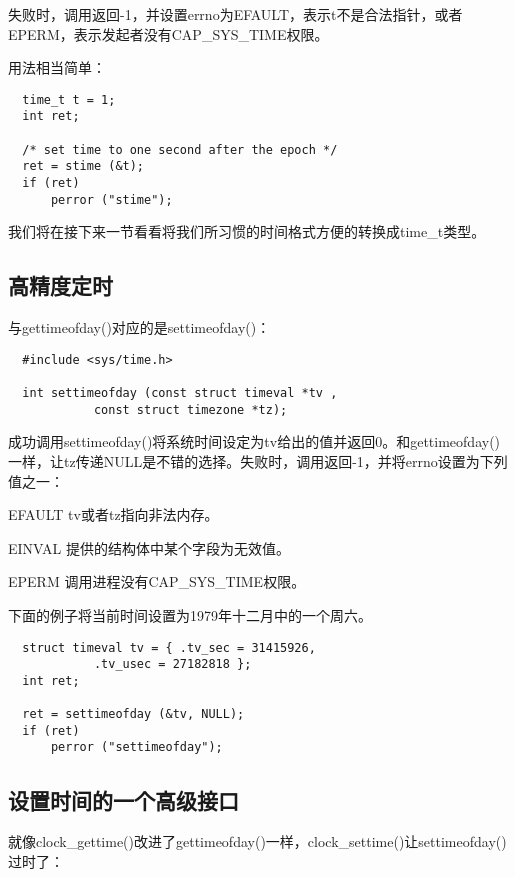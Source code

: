 失败时，调用返回-1，并设置errno为EFAULT，表示t不是合法指针，或者EPERM，表示发起者没有CAP\_SYS\_TIME权限。

用法相当简单： 

\begin{lstlisting}
  time_t t = 1;
  int ret;

  /* set time to one second after the epoch */
  ret = stime (&t);
  if (ret)
      perror ("stime");
\end{lstlisting}

我们将在接下来一节看看将我们所习惯的时间格式方便的转换成time\_t类型。 

\subsection{高精度定时}

与gettimeofday()对应的是settimeofday()： 

\begin{lstlisting}
  #include <sys/time.h>

  int settimeofday (const struct timeval *tv ,
  		    const struct timezone *tz);
\end{lstlisting}

成功调用settimeofday()将系统时间设定为tv给出的值并返回0。和gettimeofday()一样，让tz传递NULL是不错的选择。失败时，调用返回-1，并将errno设置为下列值之一： 

\begin{eqlist*}
\item [EFAULT]
tv或者tz指向非法内存。 
\item [EINVAL]
提供的结构体中某个字段为无效值。 
\item [EPERM]
调用进程没有CAP\_SYS\_TIME权限。 
\end{eqlist*}

下面的例子将当前时间设置为1979年十二月中的一个周六。 

\begin{lstlisting}
  struct timeval tv = { .tv_sec = 31415926,
			.tv_usec = 27182818 };
  int ret;

  ret = settimeofday (&tv, NULL);
  if (ret)
      perror ("settimeofday");
\end{lstlisting}

\subsection{设置时间的一个高级接口}

就像clock\_gettime()改进了gettimeofday()一样，clock\_settime()让settimeofday()过时了： 

